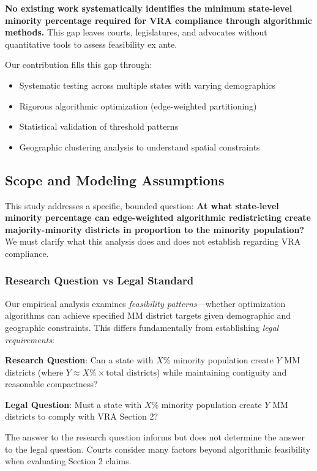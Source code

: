\textbf{No existing work systematically identifies the minimum state-level minority percentage required for VRA compliance through algorithmic methods.} This gap leaves courts, legislatures, and advocates without quantitative tools to assess feasibility ex ante.

Our contribution fills this gap through:
\begin{itemize}
    \item Systematic testing across multiple states with varying demographics
    \item Rigorous algorithmic optimization (edge-weighted partitioning)
    \item Statistical validation of threshold patterns
    \item Geographic clustering analysis to understand spatial constraints
\end{itemize}

\subsection{Scope and Modeling Assumptions}

This study addresses a specific, bounded question: \textbf{At what state-level minority percentage can edge-weighted algorithmic redistricting create majority-minority districts in proportion to the minority population?} We must clarify what this analysis does and does not establish regarding VRA compliance.

\subsubsection{Research Question vs Legal Standard}

Our empirical analysis examines \emph{feasibility patterns}---whether optimization algorithms can achieve specified MM district targets given demographic and geographic constraints. This differs fundamentally from establishing \emph{legal requirements}:

\textbf{Research Question}: Can a state with $X$\% minority population create $Y$ MM districts (where $Y \approx X\% \times \text{total districts}$) while maintaining contiguity and reasonable compactness?

\textbf{Legal Question}: Must a state with $X$\% minority population create $Y$ MM districts to comply with VRA Section 2?

The answer to the research question informs but does not determine the answer to the legal question. Courts consider many factors beyond algorithmic feasibility when evaluating Section 2 claims.

